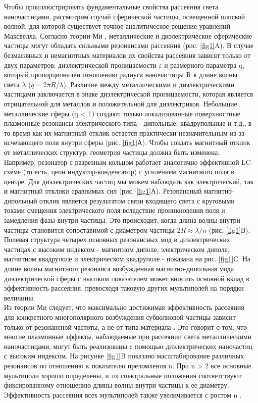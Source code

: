 \hspace*{2mm}Чтобы проиллюстрировать фундаментальные свойства рассеяния света наночастицами, рассмотрим случай сферической частицы, освещенной плоской волной, для которой существует точное аналитическое решение уравнений Максвелла. Согласно теории Ми \cite{absorbScattLight}, металлические и диэлектрические сферические частицы могут обладать сильными резонансами рассеяния (рис. \ref{fig1}A). В случае безмасляных и немагнитных материалов их свойства рассеяния зависят только от двух параметров: диэлектрической проницаемости $\varepsilon$  и размерного параметра q, который пропорционален отношению радиуса наночастицы R к длине волны света $\lambda$ ($q = 2\pi R/\lambda$). Различие между металлическими и диэлектрическими частицами заключается в знаке диэлектрической проницаемости, которая является отрицательной для металлов и положительной для диэлектриков. Небольшие металлические сферы (q < 1) создают только локализованные поверхностные плазмонные резонансы электрического типа - дипольные, квадрупольные и т.д., в то время как их магнитный отклик остается практически незначительным из-за исчезающего поля внутри сферы (рис. \ref{fig1}А).  Чтобы создать магнитный отклик от металлических структур, геометрия частицы должна быть изменена. Например, резонатор с разрезным кольцом \cite{magnCondEnh} работает аналогично эффективной LC-схеме (то есть, цепи индуктор-конденсатор) с усилением магнитного поля в центре. Для диэлектрических частиц мы можем наблюдать как электрический, так и магнитный отклики сравнимых сил (рис. \ref{fig1}А). Резонансный магнитно-дипольный отклик является результатом связи входящего света с круговыми токами смещения электрического поля вследствие проникновения поля и замедления фазы внутри частицы. Это происходит, когда длина волны внутри частицы становится сопоставимой с диаметром частицы $2R \approx \lambda/n$ (рис. \ref{fig1}В). Полевая структура четырех основных резонансных мод в диэлектрических частицах с высоким индексом - магнитном диполе, электрическом диполе, магнитном квадруполе и электрическом квадруполе - показана на рис. \ref{fig1}С. На длине волны магнитного резонанса возбужденная магнитно-дипольная мода диэлектрической сферы с высоким показателем может вносить основной вклад в эффективность рассеяния, превосходя таковую других мультиполей на порядки величины.
\\
\hspace*{2mm}
Из теории Ми следует, что максимально достижимая эффективность рассеяния для конкретного многополярного возбуждения субволновой частицы зависит только от резонансной частоты, а не от типа материала \cite{genPtopDielec}. Это говорит о том, что многие плазмонные эффекты, наблюдаемые при рассеянии света металлическими наночастицами, могут быть реализованы с помощью диэлектрических наночастиц с высоким индексом. На рисунке \ref{fig1}B показано масштабирование различных резонансов по отношению к показателю преломления n. При n > 2 все основные мультиполи хорошо определены, и их спектральные положения соответствуют фиксированному отношению длины волны внутри частицы к ее диаметру. Эффективность рассеяния всех мультиполей также увеличивается с ростом n \cite{optResSinanoprt}.
